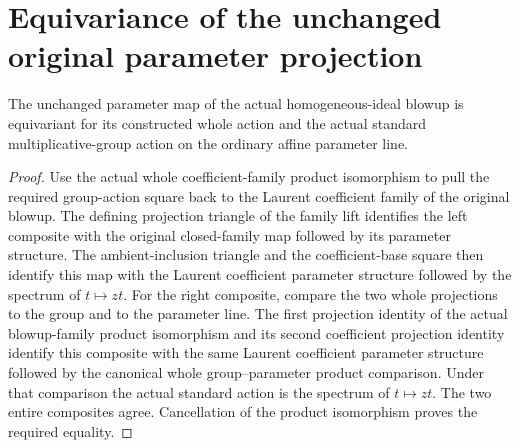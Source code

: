 \section{Equivariance of the unchanged original parameter projection}

\begin{lemma}
\label{lem:pl-original-blowup-parameter-equivariance}
\leanok
The unchanged parameter map of the actual homogeneous-ideal blowup is
equivariant for its constructed whole action and the actual standard
multiplicative-group action on the ordinary affine parameter line.
\end{lemma}
\begin{proof}
Use the actual whole coefficient-family product isomorphism to pull the
required group-action square back to the Laurent coefficient family of
the original blowup. The defining projection triangle of the family lift
identifies the left composite with the original closed-family map followed
by its parameter structure. The ambient-inclusion triangle and the
coefficient-base square then identify this map with the Laurent coefficient
parameter structure followed by the spectrum of $t\mapsto zt$.
For the right composite, compare the two whole projections to the group
and to the parameter line. The first projection identity of the actual
blowup-family product isomorphism and its second coefficient projection
identity identify this composite with the same Laurent coefficient
parameter structure followed by the canonical whole group--parameter
product comparison. Under that comparison the actual standard action is
the spectrum of $t\mapsto zt$. The two entire composites agree.
Cancellation of the product isomorphism proves the required equality.
\end{proof}


